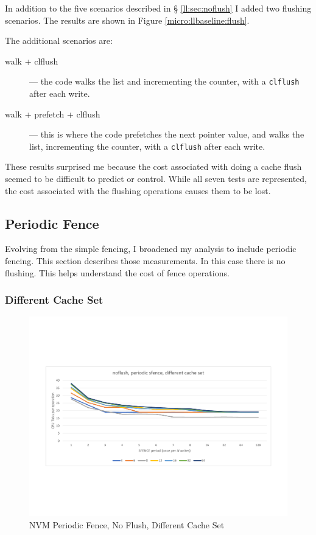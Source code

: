 In addition to the five scenarios described in \S 
\ref{ll:sec:noflush} I added two flushing scenarios.  The
results are shown in Figure \ref{micro:llbaseline:flush}.

The additional scenarios are:

\begin{description}
    \item[walk + clflush] --- the code walks the list and incrementing the counter, with a \texttt{clflush} after each write.
    \item[walk + prefetch + clflush] --- this is where the code prefetches the next pointer value, and walks the list, incrementing the counter, with a \texttt{clflush} after each write.
\end{description}

These results surprised me because the cost associated with
doing a cache flush seemed to be difficult to predict or control. While all seven tests are represented, the cost associated with the flushing operations causes them to be
lost.

\subsection{Periodic Fence}

Evolving from the simple fencing, I broadened my analysis to include periodic fencing.  This section describes those measurements.  In this case there is no flushing.  This helps understand the cost of fence operations. 



\subsubsection{Different Cache Set}

\begin{figure}
    \centering
    \caption{NVM Periodic Fence, No Flush, Different Cache Set}\label{micro:sfence:noflush:different}
    \includegraphics[scale=0.35]{micro/nvm-noflush-periodic-different.pdf}
\end{figure}


